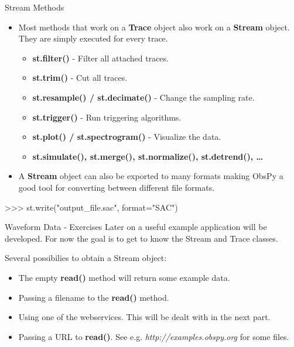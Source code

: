 \begin{frame}{Stream Methods}

 \begin{itemize}
     \item Most methods that work on a \textbf{Trace} object also work on a \textbf{Stream} object. They are simply executed for every trace.
         \begin{itemize}
             \item \textbf{st.filter()} - Filter all attached traces.
             \item \textbf{st.trim()} - Cut all traces.
             \item \textbf{st.resample() / st.decimate()} - Change the sampling rate.
             \item \textbf{st.trigger()} - Run triggering algorithms.
             \item \textbf{st.plot() / st.spectrogram()} - Visualize the data.
             \item \textbf{st.simulate(), st.merge(), st.normalize(), st.detrend(), \dots}
         \end{itemize}
     \item A \textbf{Stream} object can also be exported to many formats making ObsPy a good tool for converting between different file formats.

\end{itemize}
\begin{myColorBox}{0.95}{}
\begin{python}
>>> st.write("output_file.sac", format="SAC")
\end{python}
\end{myColorBox}

\end{frame}

\begin{frame}{Waveform Data - Exercises}
    Later on a useful example application will be developed. For now the goal is to get to know the Stream and Trace classes.

    \vspace{2ex}

    Several possibilies to obtain a Stream object:
    \begin{itemize}
        \item The empty \textbf{read()} method will return some example data.
        \item Passing a filename to the \textbf{read()} method.
        \item Using one of the webservices. This will be dealt with in the next part.
        \item Passing a URL to \textbf{read()}. See e.g. \textit{http://examples.obspy.org} for some files.
    \end{itemize}

    \vspace{2ex}

\end{frame}

